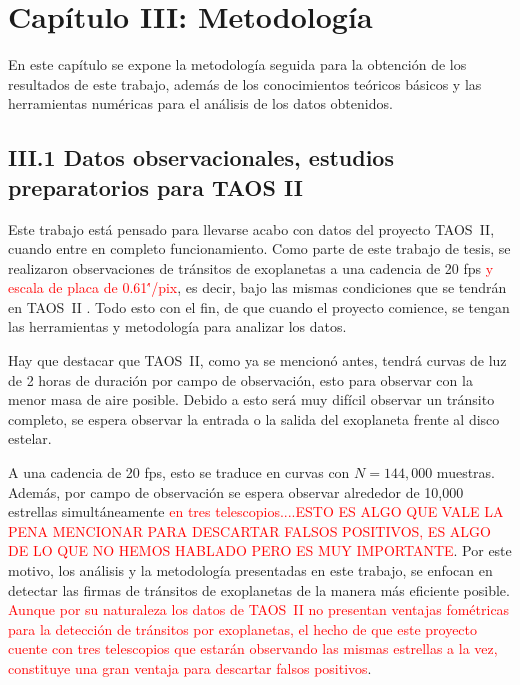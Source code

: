 \chapter*{\textbf{Capítulo III: Metodología}}
\label{ch:Metodologia}
\setcounter{chapter}{3}
\setcounter{equation}{0}
\setcounter{figure}{0}
\setcounter{table}{0}

En este capítulo se expone la metodología seguida para la obtención de los resultados de este trabajo, adem\'as de los conocimientos teóricos básicos y las herramientas numéricas para el análisis de los datos obtenidos.


\section*{III.1 Datos observacionales, estudios preparatorios para TAOS II}

Este trabajo está pensado para llevarse acabo con datos del proyecto TAOS~II, cuando entre en completo funcionamiento. Como parte de este trabajo de tesis, se realizaron observaciones de tránsitos de exoplanetas a una cadencia de 20 fps \textcolor{red}{y escala de placa de 0.61\''/pix}, es decir, bajo las mismas condiciones que se tendrán en TAOS~II \cite{lehner2012transneptunian}. Todo esto con el fin, de que cuando el proyecto comience, se tengan las herramientas y metodología para analizar los datos.

Hay que destacar que TAOS~II, como ya se mencionó antes, tendrá curvas de luz de 2 horas de duraci\'on por campo de observación, esto para observar con la menor masa de aire posible. Debido a esto será muy difícil observar un tránsito completo, se espera observar la entrada o la salida del exoplaneta frente al disco estelar. 

A una cadencia de 20 fps, esto se traduce en curvas con $N=144,000$ muestras. Además, por campo de observación se espera observar alrededor de 10,000 estrellas simultáneamente \textcolor{red}{en tres telescopios....ESTO ES ALGO QUE VALE LA PENA MENCIONAR PARA DESCARTAR FALSOS POSITIVOS, ES ALGO DE LO QUE NO HEMOS HABLADO PERO ES MUY IMPORTANTE}. Por este motivo, los análisis y la metodología presentadas en este trabajo, se enfocan en detectar las firmas de tránsitos de exoplanetas de la manera más eficiente posible. \textcolor{red}{Aunque por su naturaleza los datos de TAOS~II no presentan ventajas fométricas para la detección de tránsitos por exoplanetas, el hecho de que este proyecto cuente con tres telescopios que estarán observando las mismas estrellas a la vez, constituye una gran ventaja para descartar falsos positivos}.

